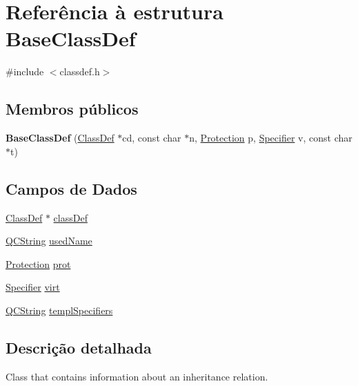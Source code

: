 \hypertarget{struct_base_class_def}{\section{Referência à estrutura Base\-Class\-Def}
\label{struct_base_class_def}
}


{\ttfamily \#include $<$classdef.\-h$>$}

\subsection*{Membros públicos}
\begin{DoxyCompactItemize}
\item 
\hypertarget{struct_base_class_def_ab47429e0ccf9dda410340a0d276ad174}{{\bfseries Base\-Class\-Def} (\hyperlink{class_class_def}{Class\-Def} $\ast$cd, const char $\ast$n, \hyperlink{types_8h_a90e352184df58cd09455fe9996cd4ded}{Protection} p, \hyperlink{types_8h_ab16236bdd10ddf4d73a9847350f0017e}{Specifier} v, const char $\ast$t)}\label{struct_base_class_def_ab47429e0ccf9dda410340a0d276ad174}

\end{DoxyCompactItemize}
\subsection*{Campos de Dados}
\begin{DoxyCompactItemize}
\item 
\hyperlink{class_class_def}{Class\-Def} $\ast$ \hyperlink{struct_base_class_def_a9ecae2706174bc69faacb7156966b12e}{class\-Def}
\item 
\hyperlink{class_q_c_string}{Q\-C\-String} \hyperlink{struct_base_class_def_a20a7352756abebcff874b7e28751d20c}{used\-Name}
\item 
\hyperlink{types_8h_a90e352184df58cd09455fe9996cd4ded}{Protection} \hyperlink{struct_base_class_def_a3f887065f93ce5f02dea21da35468e8e}{prot}
\item 
\hyperlink{types_8h_ab16236bdd10ddf4d73a9847350f0017e}{Specifier} \hyperlink{struct_base_class_def_aa05b4729c780621416429c6aac10fccf}{virt}
\item 
\hyperlink{class_q_c_string}{Q\-C\-String} \hyperlink{struct_base_class_def_aea659c4ea8200bb40a20fa289d5acc72}{templ\-Specifiers}
\end{DoxyCompactItemize}


\subsection{Descrição detalhada}
Class that contains information about an inheritance relation. 

